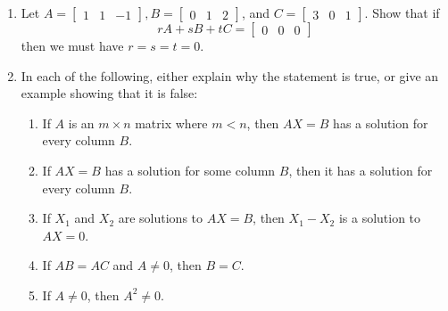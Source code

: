 \documentclass[letterpaper,12pt]{article}
\begin{document}
\begin{enumerate}
 \item Let $A = \begin{bmatrix} 1 & 1 & -1 \end{bmatrix}, B = \begin{bmatrix}
 0 & 1 & 2
 \end{bmatrix}$, and $C = \begin{bmatrix}
 3 & 0  & 1
 \end{bmatrix}$. Show that if 
 \[
 rA+sB+tC=\begin{bmatrix}
 0 & 0 & 0
 \end{bmatrix}
 \]
 then we must have $r=s=t=0$. 
 \item In each of the following, either explain why the statement is true, or give an example showing that it is false:
 \begin{enumerate}
 \item If $A$ is an $m\times n$ matrix where $m<n$, then $AX=B$ has a solution for every column $B$.
 \item If $AX=B$ has a solution for some column $B$, then it has a solution for every column $B$.
 \item If $X_1$ and $X_2$ are solutions to $AX=B$, then $X_1-X_2$ is a solution to $AX=0$.
 \item If $AB=AC$ and $A\neq 0$, then $B=C$.
 \item If $A\neq 0$, then $A^2\neq 0$.
 \end{enumerate}
 \end{enumerate}
\end{document}

